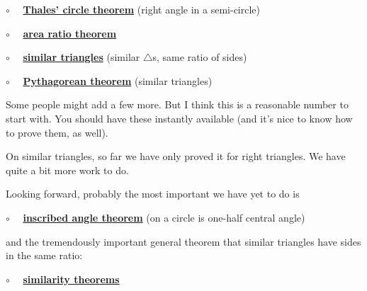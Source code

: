 \documentclass[11pt, oneside]{article}
\begin{document}
$\circ$ \ \ \hyperref[sec:Thales_theorem]{\textbf{Thales' circle theorem}} (right angle in a semi-circle)

$\circ$ \ \ \hyperref[sec:area_ratio_theorem]{\textbf{area ratio theorem}}

$\circ$ \ \  \hyperref[sec:similar_right_triangles]{\textbf{similar triangles}} (similar $\triangle$s, same ratio of sides)

$\circ$ \ \ \hyperref[sec:Pythagoras_similar_triangles]{\textbf{Pythagorean theorem}} (similar triangles)

Some people might add a few more.  But I think this is a reasonable number to start with.  You should have these instantly available (and it's nice to know how to prove them, as well).

On similar triangles, so far we have only proved it for right triangles.  We have quite a bit more work to do.

Looking forward, probably the most important we have yet to do is

$\circ$ \ \ \hyperref[sec:peripheral_angle]{\textbf{inscribed angle theorem}} (on a circle is one-half central angle)

and the tremendously important general theorem that similar triangles have sides in the same ratio:

$\circ$ \ \ \hyperref[sec:similarity_and_ratios]{\textbf{similarity theorems}}
\end{document}
